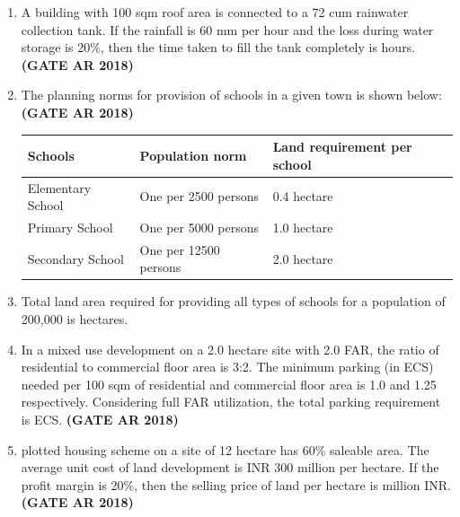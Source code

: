 \documentclass[journal,15pt,onecolumn]{IEEEtran}
\theoremstyle{remark}
\begin{document}
\begin{enumerate}
\vspace{1cm}

\item 
A building with 100 sqm roof area is connected to a 72 cum rainwater collection tank. If the rainfall is 60 mm per hour and the loss during water storage is 20\%, then the time taken to fill the tank completely is \underline{\hspace{3cm}} hours.\hfill \textbf{ (GATE AR 2018)}

 
\item 
The planning norms for provision of schools in a given town is shown below:\hfill \textbf{ (GATE AR 2018)}

\begin{table}[h!]
\centering
\begin{tabular}{|l|l|l|}
\hline
\textbf{Schools} & \textbf{Population norm} & \textbf{Land requirement per school} \\
\hline
Elementary School & One per 2500 persons & 0.4 hectare \\
Primary School    & One per 5000 persons & 1.0 hectare \\
Secondary School  & One per 12500 persons & 2.0 hectare \\
\hline
\end{tabular}
\end{table}

\item 

Total land area required for providing all types of schools for a population of 200,000 is \underline{\hspace{3cm}} hectares.


\item 
In a mixed use development on a 2.0 hectare site with 2.0 FAR, the ratio of residential to commercial floor area is 3:2. The minimum parking (in ECS) needed per 100 sqm of residential and commercial floor area is 1.0 and 1.25 respectively. Considering full FAR utilization, the total parking requirement is \underline{\hspace{3cm}} ECS.\hfill \textbf{ (GATE AR 2018)}


\item 
plotted housing scheme on a site of 12 hectare has 60\% saleable area. The average unit cost of land development is INR 300 million per hectare. If the profit margin is 20\%, then the selling price of land per hectare is \underline{\hspace{3cm}} million INR.\hfill \textbf{ (GATE AR 2018)}



\end{enumerate}
\end{document}
